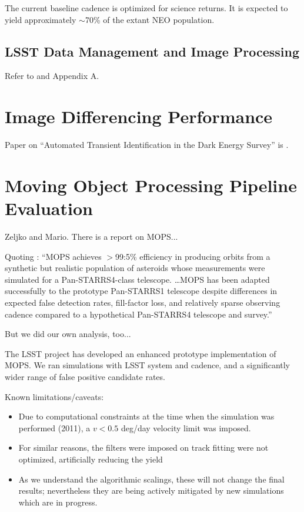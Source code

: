 \documentclass[12pt,preprint]{aastex}
\begin{document}
The current baseline cadence is optimized for science returns.
It is expected to yield approximately $\sim$70\% of the extant NEO population.


\subsection{LSST  Data Management and Image Processing} 

Refer to \cite{DM2016} and Appendix A. 


\section{Image Differencing Performance}
%

Paper on ``Automated Transient Identification in the Dark Energy
Survey''  is \cite{goldstein15}. 


\section{Moving Object Processing Pipeline Evaluation}

Zeljko and Mario. There is a report on MOPS... 

Quoting \cite{denneau13}: ``MOPS achieves $>$99:5\% efficiency in
producing orbits from a synthetic
but realistic population of asteroids whose measurements were
simulated for a Pan-STARRS4-class telescope. \dots MOPS has been
adapted successfully to the prototype Pan-STARRS1 telescope despite
differences in expected false detection rates, fill-factor loss, and
relatively sparse observing cadence compared to a hypothetical
Pan-STARRS4 telescope and survey.'' 

But we did our own analysis, too...

The LSST project has developed an enhanced prototype implementation of MOPS.
We ran simulations with LSST system and cadence, and a significantly
wider range of false positive candidate rates. 

Known limitations/caveats:
\begin{itemize}
\item Due to computational constraints at the time when the simulation
  was performed (2011), a $v < 0.5$ deg/day velocity limit was
  imposed.
\item For similar reasons, the filters were imposed on track fitting
  were not optimized, artificially reducing the yield
\item As we understand the algorithmic scalings, these will not change the
final results; nevertheless they are being actively mitigated by new
simulations which are in progress.
\end{itemize}
\end{document}
